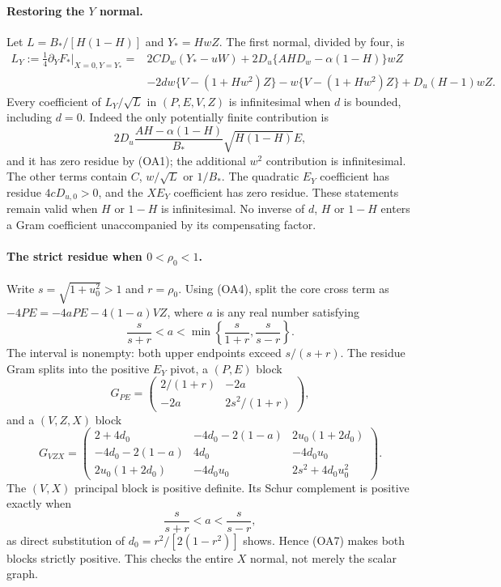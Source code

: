 \paragraph{Restoring the $Y$ normal.}
Let $L=B_*/[H(1-H)]$ and $Y_*=HwZ$.
The first normal, divided by four, is
\begin{align*}
 L_Y:=\frac14\partial_YF_*\big|_{X=0,Y=Y_*}
={}&2CD_w(Y_*-uW)+2D_u\{AH D_w-\alpha(1-H)\}wZ\\
&-2dw\{V-(1+Hw^2)Z\}
 -w\{V-(1+Hw^2)Z\}+D_u(H-1)wZ.
\tag{OA6}
\end{align*}
Every coefficient of $L_Y/\sqrt L$ in $(P,E,V,Z)$ is infinitesimal
when $d$ is bounded, including $d=0$.  Indeed the only potentially finite contribution is
\[
 2D_u\frac{AH-\alpha(1-H)}{B_*}\sqrt{H(1-H)}E,
\]
and it has zero residue by (OA1); the additional $w^2$ contribution is
infinitesimal.  The other terms contain $C$, $w/\sqrt L$ or $1/B_*$.
The quadratic $E_Y$ coefficient has residue $4cD_{u,0}>0$, and the
$X E_Y$ coefficient has zero residue.  These statements remain valid
when $H$ or $1-H$ is infinitesimal.  No inverse of $d$, $H$ or $1-H$ enters a Gram coefficient
unaccompanied by its compensating factor.

\paragraph{The strict residue when $0<\rho_0<1$.}
Write $s=\sqrt{1+u_0^2}>1$ and $r=\rho_0$.
Using (OA4), split the core cross term as
$-4PE=-4aPE-4(1-a)VZ$, where $a$ is any real number satisfying
\[
 \frac{s}{s+r}<a<\min\left\{\frac{s}{1+r},\frac{s}{s-r}\right\}.
\tag{OA7}
\]
The interval is nonempty: both upper endpoints exceed $s/(s+r)$.
The residue Gram splits into the positive $E_Y$ pivot, a $(P,E)$ block
\[
 G_{PE}=\begin{pmatrix}2/(1+r)&-2a\\-2a&2s^2/(1+r)\end{pmatrix},
\]
and a $(V,Z,X)$ block
\[
 G_{VZX}=\begin{pmatrix}
 2+4d_0&-4d_0-2(1-a)&2u_0(1+2d_0)\\
 -4d_0-2(1-a)&4d_0&-4d_0u_0\\
 2u_0(1+2d_0)&-4d_0u_0&2s^2+4d_0u_0^2
 \end{pmatrix}.
\tag{OA8}
\]
The $(V,X)$ principal block is positive definite.  Its Schur complement
is positive exactly when
\[
 \frac{s}{s+r}<a<\frac{s}{s-r},
\]
as direct substitution of $d_0=r^2/[2(1-r^2)]$ shows.  Hence (OA7)
makes both blocks strictly positive.  This checks the entire $X$ normal,
not merely the scalar graph.


